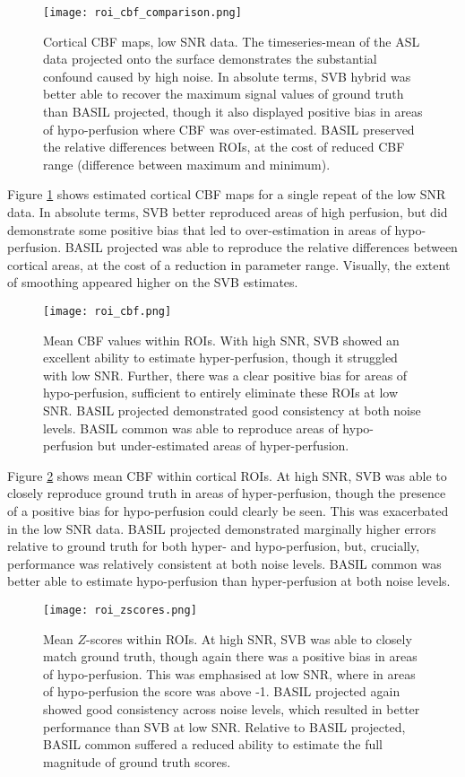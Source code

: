 \begin{figure}[H]
\centering
\texttt{[image: roi\_cbf\_comparison.png]}
\caption{Cortical CBF maps, low SNR data. The timeseries-mean of the ASL data projected onto the surface demonstrates the substantial confound caused by high noise. In absolute terms, SVB hybrid was better able to recover the maximum signal values of ground truth than BASIL projected, though it also displayed positive bias in areas of hypo-perfusion where CBF was over-estimated. BASIL preserved the relative differences between ROIs, at the cost of reduced CBF range (difference between maximum and minimum).}
\label{roi_cbf_comparison} 
\end{figure}

Figure \ref{roi_cbf_comparison} shows estimated cortical CBF maps for a single repeat of the low SNR data. In absolute terms, SVB better reproduced areas of high perfusion, but did demonstrate some positive bias that led to over-estimation in areas of hypo-perfusion. BASIL projected was able to reproduce the relative differences between cortical areas, at the cost of a reduction in parameter range. Visually, the extent of smoothing appeared higher on the SVB estimates. 

\begin{figure}[H]
\centering
\texttt{[image: roi\_cbf.png]}
\caption{Mean CBF values within ROIs. With high SNR, SVB showed an excellent ability to estimate hyper-perfusion, though it struggled with low SNR. Further, there was a clear positive bias for areas of hypo-perfusion, sufficient to entirely eliminate these ROIs at low SNR. BASIL projected demonstrated good consistency at both noise levels. BASIL common was able to reproduce areas of hypo-perfusion but under-estimated areas of hyper-perfusion.}
\label{roi_cbf} 
\end{figure}

Figure \ref{roi_cbf} shows mean CBF within cortical ROIs. At high SNR, SVB was able to closely reproduce ground truth in areas of hyper-perfusion, though the presence of a positive bias for hypo-perfusion could clearly be seen. This was exacerbated in the low SNR data. BASIL projected demonstrated marginally higher errors relative to ground truth for both hyper- and hypo-perfusion, but, crucially, performance was relatively consistent at both noise levels. BASIL common was better able to estimate hypo-perfusion than hyper-perfusion at both noise levels. 

\begin{figure}[H]
\centering
\texttt{[image: roi\_zscores.png]}
\caption{Mean $Z$-scores within ROIs. At high SNR, SVB was able to closely match ground truth, though again there was a positive bias in areas of hypo-perfusion. This was emphasised at low SNR, where in areas of hypo-perfusion the score was above -1. BASIL projected again showed good consistency across noise levels, which resulted in better performance than SVB at low SNR. Relative to BASIL projected, BASIL common suffered a reduced ability to estimate the full magnitude of ground truth scores.}
\label{roi_zscores} 
\end{figure}

